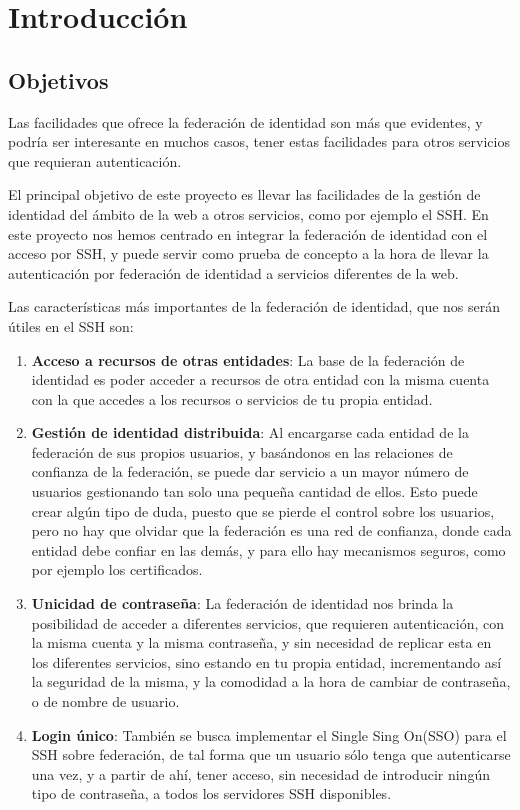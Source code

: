 \section{Introducción}
\subsection{Objetivos}

Las facilidades que ofrece la federación de identidad son más que
evidentes, y podría ser interesante en muchos casos, tener estas
facilidades para otros servicios que requieran autenticación.

El principal objetivo de este proyecto es llevar las facilidades de la
gestión de identidad del ámbito de la web a otros servicios, como por
ejemplo el SSH. En este proyecto nos hemos centrado en integrar la
federación de identidad con el acceso por SSH, y puede servir como
prueba de concepto a la hora de llevar la autenticación por federación
de identidad a servicios diferentes de la web.

Las características más importantes de la federación de identidad, que
nos serán útiles en el SSH son:
\begin{enumerate}

    \item \textbf{Acceso a recursos de otras entidades}: La base de la
    federación de identidad es poder acceder a recursos de otra
    entidad con la misma cuenta con la que accedes a los recursos o
    servicios de tu propia entidad.

    \item \textbf{Gestión de identidad distribuida}: Al encargarse
    cada entidad de la federación de sus propios usuarios, y
    basándonos en las relaciones de confianza de la federación, se
    puede dar servicio a un mayor número de usuarios gestionando tan
    solo una pequeña cantidad de ellos. Esto puede crear algún tipo de
    duda, puesto que se pierde el control sobre los usuarios, pero no
    hay que olvidar que la federación es una red de confianza, donde
    cada entidad debe confiar en las demás, y para ello hay mecanismos
    seguros, como por ejemplo los certificados.

    \item \textbf{Unicidad de contraseña}: La federación de identidad
    nos brinda la posibilidad de acceder a diferentes servicios, que
    requieren autenticación, con la misma cuenta y la misma
    contraseña, y sin necesidad de replicar esta en los diferentes
    servicios, sino estando en tu propia entidad, incrementando así la
    seguridad de la misma, y la comodidad a la hora de cambiar de
    contraseña, o de nombre de usuario.

    \item \textbf{Login único}: También se busca implementar el Single
    Sing On(SSO) para el SSH sobre federación, de tal forma que un
    usuario sólo tenga que autenticarse una vez, y a partir de ahí,
    tener acceso, sin necesidad de introducir ningún tipo de
    contraseña, a todos los servidores SSH disponibles.

\end{enumerate}

